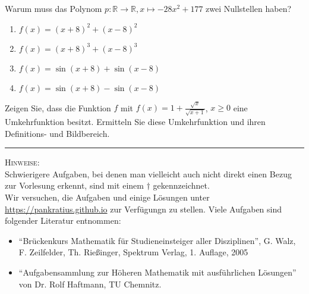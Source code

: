 \documentclass[11pt]{article}
\begin{document}
\begin{task}
	Warum muss das Polynom $p:\mathbb{R}\to \mathbb{R},x\mapsto -28x^2+177$ zwei Nullstellen haben?
\end{task}
\begin{task}
\begin{enumerate}
	\item $f(x)=(x+8)^2+(x-8)^2$
	\item $f(x)=(x+8)^3+(x-8)^3$
	\item $f(x)=\sin(x+8)+\sin(x-8)$
	\item $f(x)=\sin(x+8)-\sin(x-8)$
\end{enumerate}
\end{task}
\begin{htask}
	Zeigen Sie, dass die Funktion $f$ mit $f(x)=1+\frac{\sqrt{x}}{\sqrt{x+1}}$, $x \geq 0$ eine Umkehrfunktion besitzt. Ermitteln Sie diese Umkehrfunktion und ihren Definitions- und Bildbereich.
\end{htask}

\hrule
\vspace{.5cm}
\noindent
\textsc{Hinweise:}\\
Schwierigere Aufgaben, bei denen man vielleicht auch nicht direkt einen Bezug zur Vorlesung erkennt, sind mit einem $\dagger$ gekennzeichnet.\\
Wir versuchen, die Aufgaben und einige Lösungen unter \url{https://pankratius.github.io} zur Verfügungn zu stellen.
Viele Aufgaben sind folgender Literatur entnommen:
\begin{itemize}
	\item ``Br\"uckenkurs Mathematik f\"ur Studieneinsteiger aller Disziplinen'', G. Walz, F. Zeilfelder, Th. Rie\ss inger, Spektrum Verlag, 1. Auflage, 2005
	\item ``Aufgabensammlung zur H\"oheren Mathematik mit ausf\"uhrlichen L\"osungen'' von Dr. Rolf Haftmann, TU Chemnitz.
\end{itemize}
\end{document}
